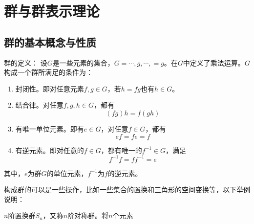 \chapter{群与群表示理论}

\section{群的基本概念与性质}
\begin{definition}{群的定义：}
	设$G$是一些元素的集合，$G = {\cdots, g, \cdots,} = {g}$。在$G$中定义了乘法运算。$G$构成一个群所满足的条件为：
	\begin{enumerate}
		\item 封闭性。即对任意元素$f, g \in G$，若$ h = fg$也有$h \in G$。
		\item 结合律。对任意$f, g, h \in G$，都有
			\begin{equation*}
				(fg)h = f(gh)
			\end{equation*} 
		\item 有唯一单位元素。即有$e \in G$，对任意$f \in G$，都有
			\begin{equation*}
			    ef = fe = f
			\end{equation*} 
		\item 有逆元素。即对任意的$f \in G$，都有唯一的$ f^{-1} \in G$，满足
			\begin{equation*}
				f^{-1} f = f f^{-1} = e
			\end{equation*} 
	\end{enumerate}
	其中，$e$为群$G$的单位元素，$f^{-1}$为$f$的逆元素。
\end{definition}
构成群的可以是一些操作，比如一些集合的置换和三角形的空间变换等，以下举例说明：
\begin{example}
	$n$阶置换群$S_n$，又称$n$阶对称群。将$n$个元素
\end{example}
